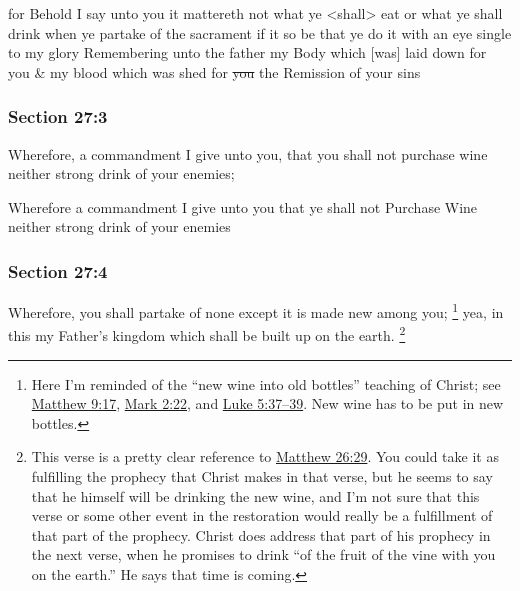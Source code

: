 		\begin{framed}
		\scriptsize
			\begin{compactdesc}
				\item[JSP] for Behold I say unto you it mattereth not what ye <shall> eat or what ye shall drink when ye partake of the sacrament if it so be that ye do it with an eye single to my glory Remembering unto the father my Body which [was] laid down for you \& my blood which was shed for \sout{you} the Remission of your sins
			\end{compactdesc}
		\end{framed}

	\subsubsection{Section 27:3} %
		\label{DC27-3}

		Wherefore, a commandment I give unto you, that you shall not purchase wine neither strong drink of your enemies;

		\begin{framed}
		\scriptsize
			\begin{compactdesc}
				\item[JSP] Wherefore a commandment I give unto you that ye shall not Purchase Wine neither strong drink of your enemies
			\end{compactdesc}
		\end{framed}

	\subsubsection{Section 27:4} %
		\label{DC27-4}

		Wherefore, you shall partake of none except it is made new among you;%
			\footnote{%
				Here I'm reminded of the ``new wine into old bottles'' teaching of Christ; see \hyperref[MATTHEW-9-17]{Matthew 9:17}, \hyperref[MARK-2-22]{Mark 2:22}, and \hyperref[LUKE-5-37]{Luke 5:37--39}. New wine has to be put in new bottles.
				}
		yea, in this my Father's kingdom which shall be built up on the earth.%
			\footnote{%
				This verse is a pretty clear reference to \hyperref[MATTHEW-26-29]{Matthew 26:29}. You could take it as fulfilling the prophecy that Christ makes in that verse, but he seems to say that he himself will be drinking the new wine, and I'm not sure that this verse or some other event in the restoration would really be a fulfillment of that part of the prophecy. Christ does address that part of his prophecy in the next verse, when he promises to drink ``of the fruit of the vine with you on the earth.'' He says that time is coming.
				}

